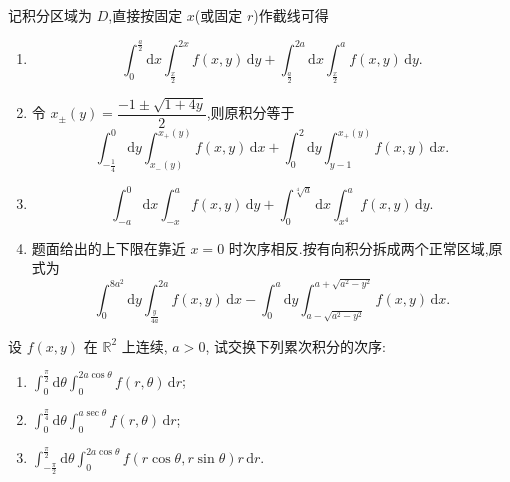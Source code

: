\begin{solution}
    记积分区域为 $D$,直接按固定 $x$(或固定 $r$)作截线可得
    \begin{enumerate}
        \item
              \[
                  \displaystyle\int_0^{\frac{a}{2}}\!\mathrm{d}x\int_{\frac{x}{2}}^{2x}f(x,y)\,\mathrm{d}y
                  +\int_{\frac{a}{2}}^{2a}\!\mathrm{d}x\int_{\frac{x}{2}}^{a}f(x,y)\,\mathrm{d}y.
              \]
        \item 令 $x_{\pm}(y)=\dfrac{-1\pm\sqrt{1+4y}}{2}$,则原积分等于
              \[
                  \displaystyle\int_{-\frac{1}{4}}^{0}\!\mathrm{d}y\int_{x_-(y)}^{x_+(y)}f(x,y)\,\mathrm{d}x
                  +\int_0^2\!\mathrm{d}y\int_{y-1}^{x_+(y)}f(x,y)\,\mathrm{d}x.
              \]
        \item
              \[
                  \displaystyle\int_{-a}^{0}\!\mathrm{d}x\int_{-x}^{a}f(x,y)\,\mathrm{d}y
                  +\int_0^{\sqrt[4]{a}}\!\mathrm{d}x\int_{x^4}^{a}f(x,y)\,\mathrm{d}y.
              \]
        \item 题面给出的上下限在靠近 $x=0$ 时次序相反.按有向积分拆成两个正常区域,原式为
              \[
                  \displaystyle\int_0^{8a^2}\!\mathrm{d}y\int_{\frac{y}{4a}}^{2a}f(x,y)\,\mathrm{d}x
                  -\int_0^a\!\mathrm{d}y\int_{a-\sqrt{a^2-y^2}}^{a+\sqrt{a^2-y^2}}f(x,y)\,\mathrm{d}x.
              \]
    \end{enumerate}
\end{solution}

\begin{example}[\markstar]
    设 $f(x,y)$ 在 $\mathbb{R}^2$ 上连续, $a>0$, 试交换下列累次积分的次序:
    \begin{enumerate}
        \item $\displaystyle\int_0^{\frac{\pi}{2}}\mathrm{d}\theta\int_0^{2a\cos\theta}f(r,\theta)\,\mathrm{d}r$;
        \item $\displaystyle\int_0^{\frac{\pi}{4}}\mathrm{d}\theta\int_0^{a\sec\theta}f(r,\theta)\,\mathrm{d}r$;
        \item $\displaystyle\int_{-\frac{\pi}{2}}^{\frac{\pi}{2}}\mathrm{d}\theta\int_0^{2a\cos\theta}f(r\cos\theta,r\sin\theta)r\,\mathrm{d}r$.
    \end{enumerate}
\end{example}
\exampleblank

